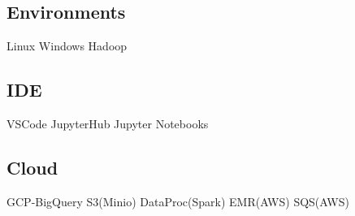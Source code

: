 \documentclass[]{Vishnu-Resume}
\begin{document}
\begin{minipage}[t]{0.33\textwidth}
\subsection{Environments}
Linux \textbullet{} Windows  \textbullet{} Hadoop 

\subsection{IDE}
VSCode \textbullet{} JupyterHub \textbullet{} Jupyter Notebooks

\subsection{Cloud}
GCP-BigQuery \textbullet{} S3(Minio) \textbullet{} DataProc(Spark) \textbullet{} EMR(AWS) \textbullet{} SQS(AWS)
%
%

\end{minipage} 
\hfill
\end{document}
